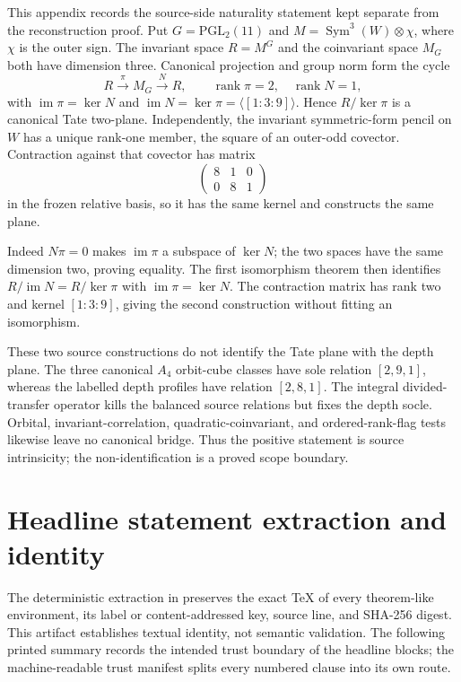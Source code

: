 \documentclass[11pt]{article}
\theoremstyle{definition}
\theoremstyle{remark}
\begin{document}
This appendix records the source-side naturality statement kept separate
from the reconstruction proof.  Put $G=\mathrm{PGL}_2(11)$ and
$M=\operatorname{Sym}^3(W)\otimes\chi$, where $\chi$ is the outer sign.
The invariant space $R=M^G$ and the coinvariant space $M_G$ both have
dimension three.  Canonical projection and group norm form the cycle
\[
 R\xrightarrow{\ \pi\ }M_G\xrightarrow{\ N\ }R,\qquad
 \operatorname{rank}\pi=2,\quad\operatorname{rank}N=1,
\]
with $\operatorname{im}\pi=\ker N$ and
$\operatorname{im}N=\ker\pi=\langle[1:3:9]\rangle$.  Hence
$R/\ker\pi$ is a canonical Tate two-plane.  Independently, the invariant
symmetric-form pencil on $W$ has a unique rank-one member, the square of
an outer-odd covector.  Contraction against that covector has matrix
\[
 \begin{pmatrix}8&1&0\\0&8&1\end{pmatrix}
\]
in the frozen relative basis, so it has the same kernel and constructs the
same plane.

Indeed $N\pi=0$ makes $\operatorname{im}\pi$ a subspace of $\ker N$;
the two spaces have the same dimension two, proving equality.  The first
isomorphism theorem then identifies
$R/\operatorname{im}N=R/\ker\pi$ with $\operatorname{im}\pi=\ker N$.
The contraction matrix has rank two and kernel $[1:3:9]$, giving the
second construction without fitting an isomorphism.

These two source constructions do not identify the Tate plane with the
depth plane.  The three canonical $A_4$ orbit-cube classes have sole
relation $[2,9,1]$, whereas the labelled depth profiles have relation
$[2,8,1]$.  The integral divided-transfer operator kills the balanced
source relations but fixes the depth socle.  Orbital, invariant-correlation,
quadratic-coinvariant, and ordered-rank-flag tests likewise leave no
canonical bridge.  Thus the positive statement is source intrinsicity;
the non-identification is a proved scope boundary.

\section{Headline statement extraction and identity}
\label{app:statement-identity}

The deterministic extraction in
 preserves the exact \TeX{}
of every theorem-like environment, its label or content-addressed key,
source line, and SHA-256 digest.  This artifact establishes textual identity,
not semantic validation.  The following printed summary records the intended
trust boundary of the headline blocks; the machine-readable trust manifest
splits every numbered clause into its own route.
\end{document}
